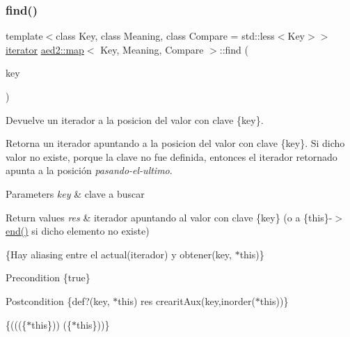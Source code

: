 \subsubsection{\texorpdfstring{find()}{find()}\hspace{0.1cm}{\footnotesize\ttfamily [1/4]}}
{\footnotesize\ttfamily template$<$class Key, class Meaning, class Compare = std\+::less$<$\+Key$>$$>$ \\
\hyperlink{classaed2_1_1map_1_1iterator}{iterator} \hyperlink{classaed2_1_1map}{aed2\+::map}$<$ Key, Meaning, Compare $>$\+::find (\begin{DoxyParamCaption}\item[{const Key \&}]{key }\end{DoxyParamCaption})\hspace{0.3cm}{\ttfamily [inline]}}



Devuelve un iterador a la posicion del valor con clave \{key\}. 

Retorna un iterador apuntando a la posicion del valor con clave \{key\}. Si dicho valor no existe, porque la clave no fue definida, entonces el iterador retornado apunta a la posición {\itshape pasando-\/el-\/ultimo}.


\begin{DoxyParams}{Parameters}
{\em key} & clave a buscar \\
\hline
\end{DoxyParams}

\begin{DoxyRetVals}{Return values}
{\em res} & iterador apuntando al valor con clave \{key\} (o a \{this\}-\/$>$\hyperlink{classaed2_1_1map_a76023e6a56cb625513e1b5ea028bf983}{end()} si dicho elemento no existe)\\
\hline
\end{DoxyRetVals}
\{Hay aliasing entre el actual(iterador) y obtener(key, $\ast$this)\}

\begin{DoxyPrecond}{Precondition}
\{true\} 
\end{DoxyPrecond}
\begin{DoxyPostcond}{Postcondition}
\{def?(key, $\ast$this)  res  crearit\+Aux(key,inorder($\ast$this))\}
\end{DoxyPostcond}
\{(((\{$\ast$this\}))  (\{$\ast$this\}))\}

